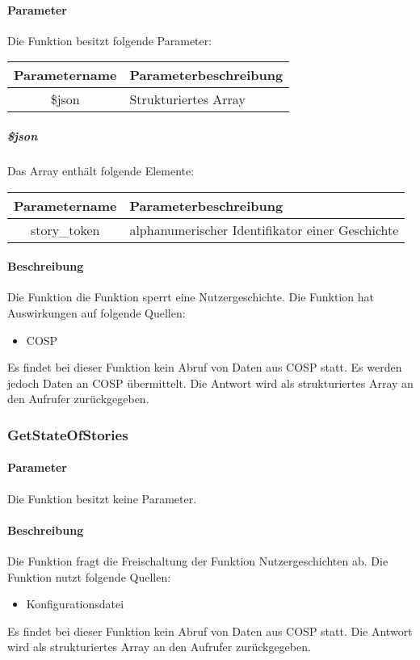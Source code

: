 \paragraph{Parameter} Die Funktion besitzt folgende Parameter:
\begin{table}[H]
	\begin{tabular}{|c|p{11cm}|}
		\hline
		\textbf{Parametername} & \textbf{Parameterbeschreibung} \\ \hline
		\$json & Strukturiertes Array \\ \hline
	\end{tabular}
\end{table}
\subparagraph{\$json}Das Array enthält folgende Elemente:
\begin{table}[H]
	\begin{tabular}{|c|p{11cm}|}
		\hline
		\textbf{Parametername} & \textbf{Parameterbeschreibung} \\ \hline
		story\_token & alphanumerischer Identifikator einer Geschichte \\ \hline
	\end{tabular}
\end{table}
\paragraph{Beschreibung} Die Funktion die Funktion sperrt eine Nutzergeschichte. Die Funktion hat Auswirkungen auf folgende Quellen:
\begin{itemize}
	\item COSP
\end{itemize}
Es findet bei dieser Funktion kein Abruf von Daten aus {\glqq COSP\grqq} statt. Es werden jedoch Daten an {\glqq COSP\grqq} übermittelt. Die Antwort wird als strukturiertes Array an den Aufrufer zurückgegeben.
\subsubsection{GetStateOfStories}
\paragraph{Parameter} Die Funktion besitzt keine Parameter.
\paragraph{Beschreibung} Die Funktion fragt die Freischaltung der Funktion {\glqq Nutzergeschichten\grqq} ab. Die Funktion nutzt folgende Quellen:
\begin{itemize}
	\item Konfigurationsdatei
\end{itemize}
Es findet bei dieser Funktion kein Abruf von Daten aus {\glqq COSP\grqq} statt. Die Antwort wird als strukturiertes Array an den Aufrufer zurückgegeben.
